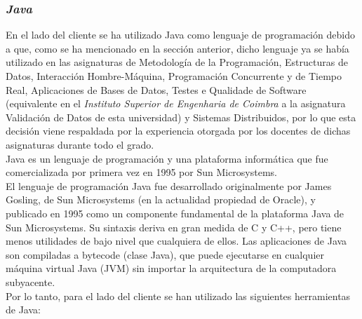\subsubsection{\textit{Java}} En el lado del cliente se ha utilizado Java como
lenguaje de programación debido a que, como se ha mencionado en la sección
anterior, dicho lenguaje ya se había utilizado en las asignaturas de Metodología
de la Programación, Estructuras de Datos, Interacción Hombre-Máquina,
Programación Concurrente y de Tiempo Real, Aplicaciones de Bases de Datos,
Testes e Qualidade de Software (equivalente en el \textit{Instituto Superior de
Engenharia de Coimbra} a la asignatura Validación de Datos de esta universidad)
y Sistemas Distribuidos, por lo que esta decisión viene respaldada por la
experiencia otorgada por los docentes de dichas asignaturas durante todo el
grado.
\\
Java es un lenguaje de programación y una plataforma informática que fue
comercializada por primera vez en 1995 por Sun Microsystems.
\\
El lenguaje de programación Java fue desarrollado originalmente por James
Gosling, de Sun Microsystems (en la actualidad propiedad de Oracle), y
publicado en 1995 como un componente fundamental de la plataforma Java de Sun
Microsystems. Su sintaxis deriva en gran medida de C y C++, pero tiene menos
utilidades de bajo nivel que cualquiera de ellos. Las aplicaciones de Java son
compiladas a bytecode (clase Java), que puede ejecutarse en cualquier máquina
virtual Java (JVM) sin importar la arquitectura de la computadora subyacente.
\\
Por lo tanto, para el lado del cliente se han utilizado las siguientes herramientas de Java:

